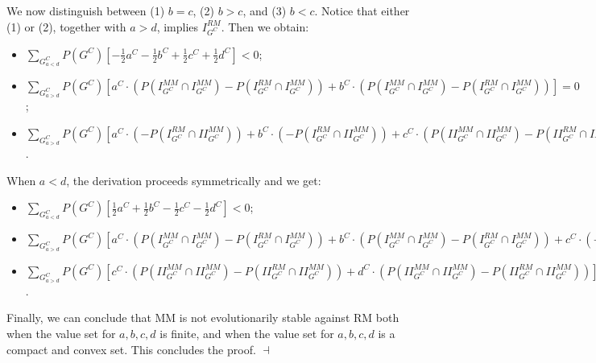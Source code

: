 \documentclass[fleqn,reqno,11pt]{article}
\begin{document}
\noindent We now distinguish between (1) $b=c$, (2) $b>c$, and (3) $b<c$. Notice that either (1) or (2), together with $a>d$, implies $I_{G^{C}}^{RM}$. Then we obtain: 
\begin{itemize}

\item[(1)] $\sum_{G_{a<d}^{C}} P(G^{C})[-\frac{1}{2}a^{C} - \frac{1}{2}b^{C} + \frac{1}{2}c^{C} + \frac{1}{2}d^{C}]< 0$;

\item[(2)] $\sum_{G_{a>d}^{C}} P(G^{C})[a^{C} \cdot (P(I_{G^{C}}^{MM}\cap I_{G^{C}}^{MM}) - P(I_{G^{C}}^{RM}\cap I_{G^{C}}^{MM})) + b^{C} \cdot  (P(I_{G^{C}}^{MM}\cap I_{G^{C}}^{MM}) - P(I_{G^{C}}^{RM}\cap I_{G^{C}}^{MM}))]= 0$;

\item[(3)] $\sum_{G_{a>d}^{C}} P(G^{C})[a^{C} \cdot (- P(I_{G^{C}}^{RM}\cap II_{G^{C}}^{MM})) + b^{C} \cdot  (- P(I_{G^{C}}^{RM}\cap II_{G^{C}}^{MM})) + c^{C} \cdot (P(II_{G^{C}}^{MM}\cap II_{G^{C}}^{MM})- P(II_{G^{C}}^{RM}\cap II_{G^{C}}^{MM})) + d^{C} \cdot (P(II_{G^{C}}^{MM}\cap II_{G^{C}}^{MM})- P(II_{G^{C}}^{RM}\cap II_{G^{C}}^{MM}))] \leq 0$.

\end{itemize}

\noindent When $a<d$, the derivation proceeds symmetrically and we get: 

\begin{itemize}

\item[(1)] $\sum_{G_{a<d}^{C}} P(G^{C})[\frac{1}{2}a^{C} + \frac{1}{2}b^{C} - \frac{1}{2}c^{C} - \frac{1}{2}d^{C}]< 0$;

\item[(2)] $\sum_{G_{a>d}^{C}} P(G^{C})[a^{C} \cdot (P(I_{G^{C}}^{MM}\cap I_{G^{C}}^{MM}) - P(I_{G^{C}}^{RM}\cap I_{G^{C}}^{MM})) + b^{C} \cdot  (P(I_{G^{C}}^{MM}\cap I_{G^{C}}^{MM}) - P(I_{G^{C}}^{RM}\cap I_{G^{C}}^{MM})) + c^{C} \cdot (- P(II_{G^{C}}^{RM}\cap I_{G^{C}}^{MM})) + d^{C} \cdot (- P(II_{G^{C}}^{RM}\cap I_{G^{C}}^{MM}))] \leq 0$

\item[(3)] $\sum_{G_{a>d}^{C}} P(G^{C})[c^{C} \cdot (P(II_{G^{C}}^{MM}\cap II_{G^{C}}^{MM})- P(II_{G^{C}}^{RM}\cap II_{G^{C}}^{MM})) + d^{C} \cdot (P(II_{G^{C}}^{MM}\cap II_{G^{C}}^{MM})- P(II_{G^{C}}^{RM}\cap II_{G^{C}}^{MM}))] = 0$.

\end{itemize}


\noindent Finally, we can conclude that MM is
not evolutionarily stable against RM both when the value set for $a,b,c,d$
is finite, and when the value set for $a,b,c,d$ is a compact and
convex set. This concludes the proof. $\dashv$
\end{document}
